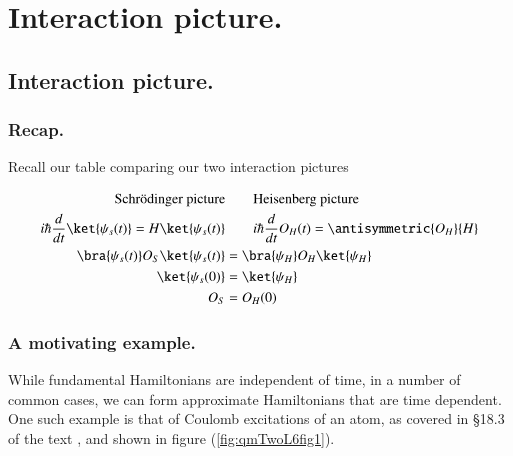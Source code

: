 %
%

\chapter{Interaction picture.}
\label{chap:qmTwoL6}
{}
\date{Sept 26, 2011}

\beginArtWithToc

%

\section{Interaction picture.}
\subsection{Recap.}

Recall our table comparing our two interaction pictures

\begin{align*}
\text{Schr\"{o}dinger picture} &\qquad \text{Heisenberg picture} \\
i \hbar \frac{d}{dt} \ket{\psi_s(t)} = H \ket{\psi_s(t)} &\qquad i \hbar \frac{d}{dt} O_H(t) = \antisymmetric{O_H}{H} \\
\bra{\psi_s(t)} O_S \ket{\psi_s(t)} &= \bra{\psi_H} O_H \ket{\psi_H} \\
\ket{\psi_s(0)} &= \ket{\psi_H} \\
O_S &= O_H(0)
\end{align*}

\subsection{A motivating example.}

While fundamental Hamiltonians are independent of time, in a number of common cases, we can form approximate Hamiltonians that are time dependent.  One such example is that of Coulomb excitations of an atom, as covered in \S 18.3 of the text \cite{desai2009quantum}, and shown in figure (\ref{fig:qmTwoL6fig1}).

